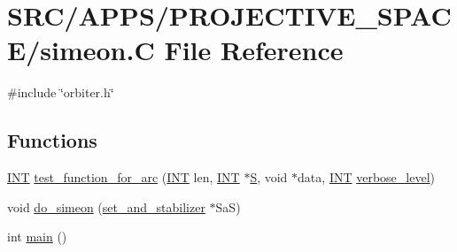 \hypertarget{simeon_8_c}{}\section{S\+R\+C/\+A\+P\+P\+S/\+P\+R\+O\+J\+E\+C\+T\+I\+V\+E\+\_\+\+S\+P\+A\+C\+E/simeon.C File Reference}
\label{simeon_8_c}
{\ttfamily \#include \char`\"{}orbiter.\+h\char`\"{}}\newline
\subsection*{Functions}
\begin{DoxyCompactItemize}
\item 
\mbox{\hyperlink{galois_8h_a09fddde158a3a20bd2dcadb609de11dc}{I\+NT}} \mbox{\hyperlink{simeon_8_c_aea48fbc94e3a6fcfdebca8e2ff571716}{test\+\_\+function\+\_\+for\+\_\+arc}} (\mbox{\hyperlink{galois_8h_a09fddde158a3a20bd2dcadb609de11dc}{I\+NT}} len, \mbox{\hyperlink{galois_8h_a09fddde158a3a20bd2dcadb609de11dc}{I\+NT}} $\ast$\mbox{\hyperlink{simeon_8_c_adab47f8243f1b5a2c31df2535d6b37d0}{S}}, void $\ast$data, \mbox{\hyperlink{galois_8h_a09fddde158a3a20bd2dcadb609de11dc}{I\+NT}} \mbox{\hyperlink{simeon_8_c_a818073fbcc2f439e7c56952f67386122}{verbose\+\_\+level}})
\item 
void \mbox{\hyperlink{simeon_8_c_a36cf3f9cb484fa44da7a7dfcbe9385d0}{do\+\_\+simeon}} (\mbox{\hyperlink{classset__and__stabilizer}{set\+\_\+and\+\_\+stabilizer}} $\ast$SaS)
\item 
int \mbox{\hyperlink{simeon_8_c_ae66f6b31b5ad750f1fe042a706a4e3d4}{main}} ()
\end{DoxyCompactItemize}
